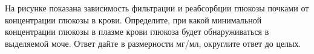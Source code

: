 
На рисунке показана зависимость фильтрации и
реабсорбции глюкозы почками от концентрации глюкозы в крови. Определите, при
какой минимальной концентрации глюкозы в плазме крови глюкоза будет
обнаруживаться в выделяемой моче. Ответ дайте в размерности мг/мл, округлите
ответ до целых.




